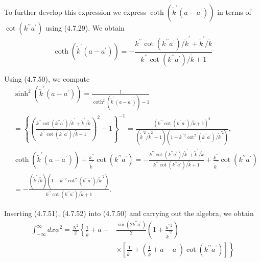 \documentclass{article}
\begin{document}
To further develop this expression we express $\operatorname{coth}\left(\tilde{k}^{\prime}\left(a-a^{\prime}\right)\right)$ in terms of $\cot \left(k^{\prime \prime} a^{\prime}\right)$ using (4.7.29). We obtain
$$
\begin{equation*}
\operatorname{coth}\left(\tilde{k}^{\prime}\left(a-a^{\prime}\right)\right)=-\frac{k^{\prime \prime} \cot \left(k^{\prime \prime} a^{\prime}\right) / \tilde{k}^{\prime}+\tilde{k}^{\prime} / \tilde{k}}{k^{\prime \prime} \cot \left(k^{\prime \prime} a^{\prime}\right) / \tilde{k}+1} \tag{4.7.50}
\end{equation*}
$$

Using (4.7.50), we compute
$$
\begin{align*}
& \sinh ^{2}\left(\tilde{k}^{\prime}\left(a-a^{\prime}\right)\right)=\frac{1}{\operatorname{coth}^{2}\left(\tilde{k}^{\prime}\left(a-a^{\prime}\right)\right)-1}  \tag{4.7.51}\\
& =\left\{\left(\frac{k^{\prime \prime} \cot \left(k^{\prime \prime} a^{\prime}\right) / \tilde{k}^{\prime}+\tilde{k}^{\prime} / \tilde{k}}{k^{\prime \prime} \cot \left(k^{\prime \prime} a^{\prime}\right) / \tilde{k}+1}\right)^{2}-1\right\}^{-1}=\frac{\left(k^{\prime \prime} \cot \left(k^{\prime \prime} a^{\prime}\right) / \tilde{k}+1\right)^{2}}{\left(\tilde{k}^{\prime 2} / \tilde{k}^{2}-1\right)\left(1-k^{\prime \prime 2} \cot ^{2}\left(k^{\prime \prime} a^{\prime}\right) / \tilde{k}^{\prime 2}\right)}, \\
& \operatorname{coth}\left(\tilde{k}^{\prime}\left(a-a^{\prime}\right)\right)+\frac{k^{\prime \prime}}{\tilde{k}^{\prime}} \cot \left(k^{\prime \prime} a^{\prime}\right)=-\frac{k^{\prime \prime} \cot \left(k^{\prime \prime} a^{\prime}\right) / \tilde{k}^{\prime}+\tilde{k}^{\prime} / \tilde{k}}{k^{\prime \prime} \cot \left(k^{\prime \prime} a^{\prime}\right) / \tilde{k}+1}+\frac{k^{\prime \prime}}{\tilde{k}^{\prime}} \cot \left(k^{\prime \prime} a^{\prime}\right)  \tag{4.7.52}\\
& =-\frac{\left(\tilde{k}^{\prime} / \tilde{k}\right)\left(1-k^{\prime \prime 2} \cot ^{2}\left(k^{\prime \prime} a^{\prime}\right) / \tilde{k}^{\prime 2}\right)}{k^{\prime \prime} \cot \left(k^{\prime \prime} a^{\prime}\right) / \tilde{k}+1} .
\end{align*}
$$

Inserting (4.7.51), (4.7.52) into (4.7.50) and carrying out the algebra, we obtain
$$
\begin{align*}
\int_{-\infty}^{\infty} d x \phi^{2}=\frac{N^{2}}{2}\left\{\frac{1}{\tilde{k}}+a-\right. & \frac{\sin \left(2 k^{\prime \prime} a^{\prime}\right)}{2}\left(1+\frac{k^{\prime \prime 2}}{\tilde{k}^{\prime 2}}\right)  \tag{4.7.53}\\
& \left.\times\left[\frac{1}{k^{\prime \prime}}+\left(\frac{1}{\tilde{k}}+a-a^{\prime}\right) \cot \left(k^{\prime \prime} a^{\prime}\right)\right]\right\}
\end{align*}
$$
\end{document}
